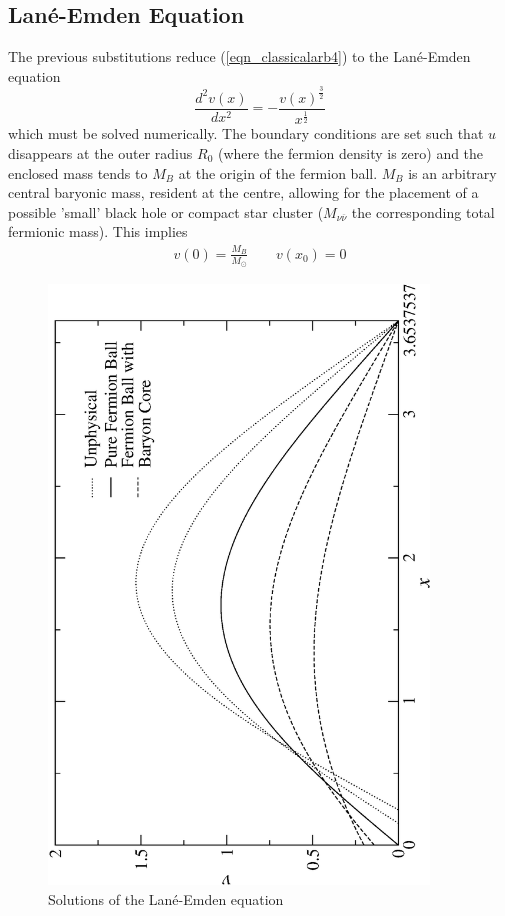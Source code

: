 \subsection{Lan\'e-Emden Equation}
The previous substitutions reduce (\ref{eqn_classicalarb4}) to the Lan\'e-Emden equation
\begin{equation}
	\frac{d^2v(x)}{dx^2} = -\frac{v(x)^\frac{3}{2}}{x^\frac{1}{2}}
	\label{eqn_laneemden}
\end{equation}
which must be solved numerically. The boundary conditions are set such that $u$ disappears at the outer radius $R_0$ (where the
fermion density is zero) and the enclosed mass tends to $M_B$ at the origin of the fermion ball. $M_B$ is an arbitrary central
baryonic mass, resident at the centre, allowing for the placement of a possible 'small' black hole or compact star cluster
($M_{\nu \overline{\nu}}$ the corresponding total fermionic mass). This implies
\begin{eqnarray*}
	v(0) = \frac{M_B}{M_\odot} \qquad
	v(x_0) = 0
\end{eqnarray*}
\begin{figure}[!htb]
	\begin{center}
	\includegraphics[angle=-90,width=0.9\textwidth]{eps/laneemden.eps}
	\caption{Solutions of the Lan\'e-Emden equation}
	\label{fig_laneemden}
	\end{center}
\end{figure}
